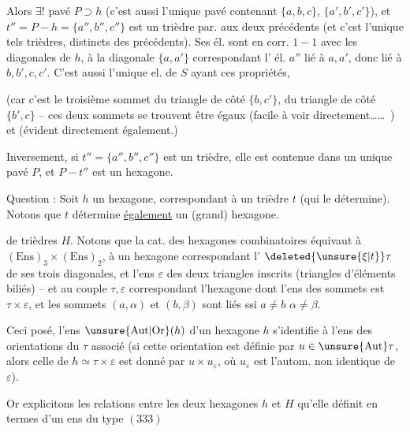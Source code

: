 Alors $\exists!$ pavé $P\supset h$ (c'est aussi l'unique pavé contenant $\{a,b,c\}$,  $\{a',b',c'\}$), et $t''=P-h=\{a'',b'',c''\}$ est un trièdre par. aux deux précédents (et c'est l'unique tels trièdres, distincts des précédents). Ses él. sont en corr. $1-1$ avec les diagonales de $h$, à la diagonale $\{a,a'\}$ correspondant l' él. $a''$    lié à $a,a'$, donc lié à $b,b',c,c'$. C'est aussi l'unique el. de $S$ ayant ces propriétés,

(car c'est le troisième sommet du triangle de côté $\{b,c'\}$,  du triangle de côté $\{b',c\}$ -- ces deux sommets se trouvent  être égaux (facile à voir directement\ldots\ldots\ ) et    (évident directement également.)

Inversement, si $t''=\{a'',b'',c''\}$ est un trièdre, elle est contenue dans un unique pavé $P$, et $P-t''$ est un hexagone.

Question : Soit $h$ un  hexagone, correspondant à un trièdre $t$ (qui le détermine). Notons que $t$ détermine \uline{également} un (grand) hexagone.


de trièdres $H$. Notons que la cat. des hexagones combinatoires équivaut à $(\mathrm{Ens})_3\times(\mathrm{Ens})_2$, à un hexagone correspondant l' $\deleted{\unsure{\xi|t}}\tau$ de ses trois diagonales, et l'ens $\varepsilon$ des deux triangles inscrits (triangles d'éléments biliés) -- et au couple $\tau,\varepsilon$ correspondant l'hexagone  dont l'ens des sommets est $\tau\times\varepsilon$,  et les sommets $(a,\alpha)$ et $(b,\beta)$ sont liés ssi $a\ne b$ $\alpha\ne\beta$.

Ceci posé, l'ens $\unsure{\mathrm{Aut}|\mathrm{Or}}(h)$ d'un hexagone $h$ s'identifie à l'ens des orientations du $\tau$ associé (si cette orientation est définie par $u\in\unsure{\mathrm{Aut}}\tau$, alors celle de $h\simeq\tau\times\varepsilon$ est donné par $u\times u_\varepsilon$, où $u_\varepsilon$ est l'autom. non identique de $\varepsilon$).

Or explicitons  les relations entre les deux hexagones $h$ et $H$ qu'elle définit en termes d'un ens du type $(333)$

